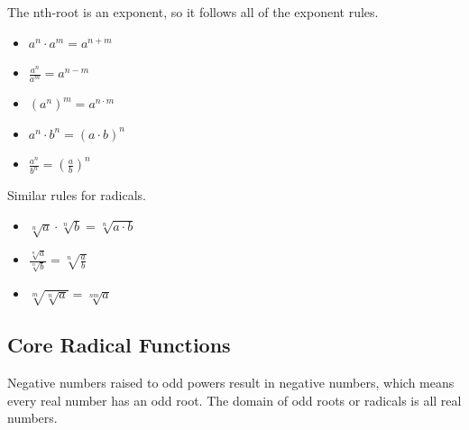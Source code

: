 \documentclass{ximera}
\begin{document}
The nth-root is an exponent, so it follows all of the exponent rules.


\begin{itemize}
\item $a^n \cdot a^m = a^{n+m}$

\item $\frac{a^n}{a^m} = a^{n-m}$

\item $(a^n)^m = a^{n \cdot m}$

\item $a^n \cdot b^n = (a \cdot b)^n$

\item $\frac{a^n}{b^n} = \left(\frac{a}{b}\right)^n$


\end{itemize}



Similar rules for radicals.

\begin{itemize}

\item $\sqrt[n]{a} \cdot \sqrt[n]{b} = \sqrt[n]{a \cdot b}$

\item $\frac{\sqrt[n]{a}}{\sqrt[n]{b}} = \sqrt[n]{\frac{a}{b}}$

\item $\sqrt[m]{\sqrt[n]{a}} = \sqrt[nm]{a}$

\end{itemize}






\subsection*{Core Radical Functions}



Negative numbers raised to odd powers result in negative numbers, which means every real number has an odd root.  The domain of odd roots or radicals is all real numbers.
\end{document}
